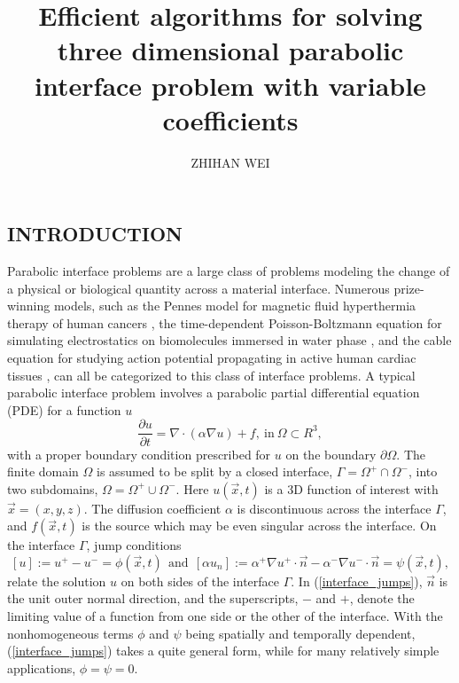 \documentclass[dissertation]{uathesis}
\author{ZHIHAN WEI}       %
\title{Efficient algorithms for solving three dimensional parabolic interface problem with variable coefficients}
\begin{document}
\makefrontmatter

\begin{body}

\nocite{*}

\chapter{\MakeUppercase{Introduction}}\label{chap: introduction}

\begin{flushleft}

\hspace{1cm} Parabolic interface problems are a large class of problems modeling the change of a physical or biological quantity across a material interface. Numerous prize-winning models, such as the Pennes model for magnetic fluid hyperthermia  therapy of human cancers \cite{pennes1948analysis}, the time-dependent Poisson-Boltzmann equation  for simulating electrostatics on biomolecules immersed in water phase \cite{geng2013,zhao2014operator}, and the cable equation for studying action potential propagating in active human cardiac tissues \cite{jack1975electric}, can all be categorized to this class of interface problems. 
A typical parabolic interface problem involves a parabolic 
partial differential equation (PDE) for a function $u$
%
\begin{equation}\label{heat_eqn}
\frac{\partial u}{\partial t} = \nabla \cdot (\alpha \nabla u)+f, ~ \mbox{in} ~\Omega \subset R^3,
\end{equation}
%
with a proper boundary condition prescribed for $u$ on the boundary $\partial \Omega$. The finite domain $\Omega$ is assumed to be split by a closed interface, $\Gamma = \Omega^{+} \cap \Omega^{-}$, into two subdomains, $\Omega = \Omega^{+} \cup \Omega^{-}$. Here $u(\vec{x},t)$ is a 3D function of interest with $\vec{x}=(x,y,z)$.  The diffusion coefficient $\alpha$ is discontinuous across the interface $\Gamma$, and $f(\vec{x},t)$ is the source which may be even singular across the interface. On the interface $\Gamma$, jump conditions
%
\begin{equation}\label{interface_jumps}
[u] := u^{+} - u^{-} = \phi(\vec{x},t) ~~ \mbox{and} ~~
[\alpha u_{n}] := \alpha^{+} \nabla u^{+} \cdot \vec {n} - \alpha^{-} \nabla u^{-} \cdot \vec {n} = \psi(\vec{x},t),
\end{equation}
%
relate the solution $u$ on both sides of the interface $\Gamma$. In (\ref{interface_jumps}), $\vec {n}$ is the unit outer normal direction, and the superscripts, $-$ and $+$, denote the limiting value of a function from one side or the other of the interface. With the nonhomogeneous terms $\phi$ and $\psi$ being spatially and temporally dependent, (\ref{interface_jumps}) takes a quite general form, while for many relatively simple applications, $\phi = \psi = 0$. 


\end{flushleft}
\end{body}
\end{document}
